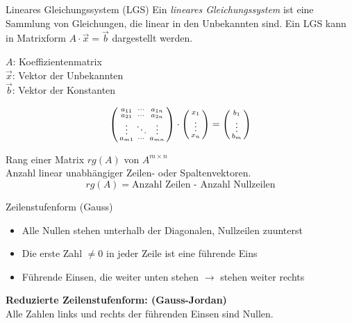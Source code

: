         \begin{definition}{Lineares Gleichungssystem (LGS)}
            Ein \textit{lineares Gleichungssystem} ist eine Sammlung von Gleichungen, 
            die linear in den Unbekannten sind. 
            Ein LGS kann in Matrixform $A\cdot\vec{x}=\vec{b}$ dargestellt werden.\\
            \begin{minipage}
                {0.45\linewidth}
                {\small
                $A$: Koeffizientenmatrix\\
                $\vec{x}$: Vektor der Unbekannten\\
                $\vec{b}$: Vektor der Konstanten}
            \end{minipage}
            \begin{minipage}{0.55\linewidth}
                $$\begin{psmallmatrix} a_{11} & \cdots & a_{1n} \\ a_{21} & \cdots & a_{2n} \\ \vdots & \ddots & \vdots \\ a_{m1} & \cdots & a_{mn} \end{psmallmatrix} \cdot \begin{psmallmatrix}
                    x_1 \\ \vdots \\ x_n
                \end{psmallmatrix} = \begin{psmallmatrix}
                    b_1 \\ \vdots \\ b_m
                \end{psmallmatrix}$$
            \end{minipage}
            
        \end{definition}

    
        \begin{theorem}{Rang einer Matrix} $rg(A)$ von $A^{m \times n}$\\
            Anzahl linear unabhängiger Zeilen- oder Spaltenvektoren.
            $$rg(A) = \text{Anzahl Zeilen - Anzahl Nullzeilen}$$
        \end{theorem}


\begin{concept}{Zeilenstufenform (Gauss)}
    \begin{itemize}
        \item Alle Nullen stehen unterhalb der Diagonalen, Nullzeilen zuunterst
        \item Die erste Zahl $\neq 0$ in jeder Zeile ist eine führende Eins
        \item Führende Einsen, die weiter unten stehen $\rightarrow$ stehen weiter rechts
    \end{itemize}
    \textbf{Reduzierte Zeilenstufenform: (Gauss-Jordan)}\\
    Alle Zahlen links und rechts der führenden Einsen sind Nullen.
\end{concept}
    
